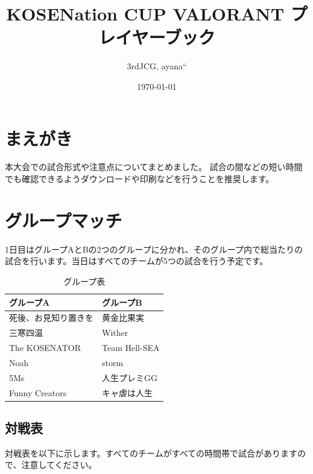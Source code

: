 \documentclass[uplatex,dvipdfmx]{jsarticle}
\title{KOSENation CUP VALORANT プレイヤーブック}
\author{\hfill 3rdJCG, ayana``}
\date{\today}
\begin{document}
\maketitle

\section{まえがき}
	本大会での試合形式や注意点についてまとめました。
	試合の間などの短い時間でも確認できるようダウンロードや印刷などを行うことを推奨します。

\section{グループマッチ}
	1日目はグループAとBの2つのグループに分かれ、そのグループ内で総当たりの試合を行います。当日はすべてのチームが5つの試合を行う予定です。

	\begin{table}[htbp]
		\centering
		\caption{グループ表}
		\begin{tabular}{p{10zw}|p{}}
			\hline
			{\bf グループA}       & {\bf グループB}  \\ \hline
			死後、お見知り置きを  & 黄金比果実       \\ \hline
			三寒四温              & Wither           \\ \hline
			The KOSENATOR         & Team Hell-SEA    \\ \hline
			Noah                  & storm            \\ \hline
			5Ms                   & 人生プレミGG     \\ \hline
			Funny Creators        & キャ虐は人生     \\ \hline
		\end{tabular}
	\end{table}


	\subsection{対戦表}
		対戦表を以下に示します。すべてのチームがすべての時間帯で試合がありますので、注意してください。
\end{document}
